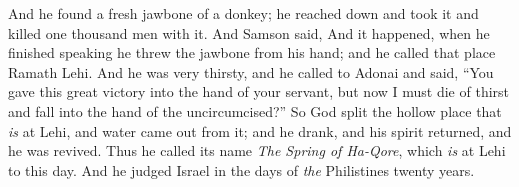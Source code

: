 \begin{biblechapter}
\verse And he found a fresh jawbone of a donkey; he reached down and took it and killed one thousand men with it.
\verse And Samson said,
\verse And it happened, when he finished speaking he threw the jawbone from his hand; and he called that place Ramath Lehi.
\verse And he was very thirsty, and he called to Adonai and said, “You gave this great victory into the hand of your servant, but now I must die of thirst and fall into the hand of the uncircumcised?”
\verse So God split the hollow place that \textit{is} at Lehi, and water came out from it; and he drank, and his spirit returned, and he was revived. Thus he called its name \textit{The Spring of Ha-Qore}, which \textit{is} at Lehi to this day.
\verse And he judged Israel in the days of \textit{the} Philistines twenty years.
\end{biblechapter}

